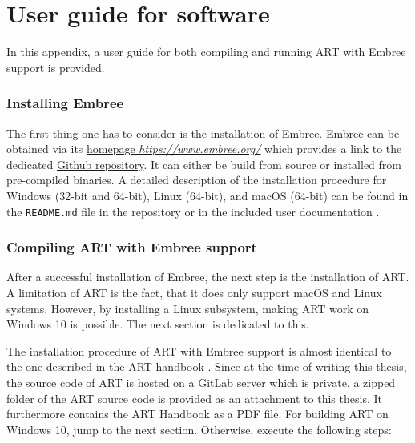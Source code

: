 \chapter{User guide for software}

In this appendix, a user guide for both compiling and running ART with Embree support is provided. 

\subsection{Installing Embree}
\label{embree}
The first thing one has to consider is the installation of Embree. Embree can be obtained via its \href{https://www.embree.org/}{homepage \emph{https://www.embree.org/}} which provides a link to the dedicated \href{https://github.com/embree/embree}{Github repository}. It can either be build from source or installed from pre-compiled binaries. A detailed description of the installation procedure for Windows (32-bit and 64-bit), Linux (64-bit), and macOS (64-bit) can be found in the \texttt{README.md} file in the repository or in the included user documentation \cite{embree2021Doc}.


\subsection{Compiling ART with Embree support}
\label{art}
After a successful installation of Embree, the next step is the installation of ART. A limitation of ART is the fact, that it does only support macOS and Linux systems. However, by installing a Linux subsystem, making ART work on Windows 10 is possible. The next section is dedicated to this. 

The installation procedure of ART with Embree support is almost identical to the one described in the ART handbook \cite{arthandbook}. Since at the time of writing this thesis, the source code of ART is hosted on a GitLab server which is private, a zipped folder of the ART source code is provided as an attachment to this thesis. It furthermore contains the ART Handbook as a PDF file. For building ART on Windows 10, jump to the next section. Otherwise, execute the following steps:

